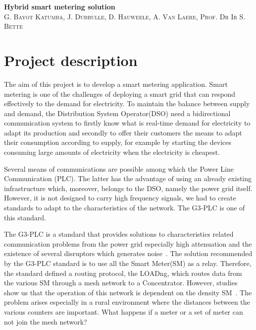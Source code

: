 \documentclass[a4paper,10pt]{article}
\begin{document}

\begin{center}
  \huge\textbf{Hybrid smart metering solution}\\
  \vspace{0.5em}
  \small\textsc{G. Bayot Katumba, J. Dubrulle, D. Hauweele, A. Van Laere, Prof. Dr Ir S. Bette}
\end{center}

\section{Project description}

The aim of this project is to develop a smart metering
application. Smart metering is one of the challenges of
deploying a smart grid that can respond effectively to the
demand for electricity. To maintain the balance between
supply and demand, the Distribution System Operator(DSO)
need a bidirectional communication system to firstly know
what is real-time demand for electricity to adapt its
production and secondly to offer their customers the means
to adapt their consumption according to supply, for example
by starting the devices consuming large amounts of
electricity when the electricity is cheapest.

Several means of communications are possible among which the
Power Line Communication (PLC). The latter has the advantage
of using an already existing infrastructure which, moreover,
belongs to the DSO, namely the power grid itself. However,
it is not designed to carry high frequency signals, we had
to create standards to adapt to the characteristics of the
network. The G3-PLC is one of this standard.

The G3-PLC is a standard that provides solutions to
characteristics related communication problems from the
power grid especially high attenuation and the existence of
several disruptors which generates noise~\cite{itu_sim2016}. The solution recommended by
the G3-PLC standard is to use all the Smart Meter(SM) as a
relay. Therefore, the standard defined a routing protocol,
the LOADng, which routes data from the various SM through a
mesh network to a Concentrator. However, studies show us
that the operation of this network is dependent on the
density SM~\cite{g3plc_density2015}. The problem
arises especially in a rural environment where the distances
between the various counters are important. What happens if
a meter or a set of meter can not join the mesh network?
\end{document}
